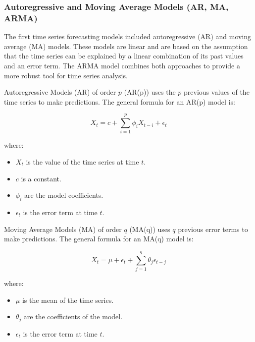 \subsubsection{Autoregressive and Moving Average Models (AR, MA, ARMA)}

The first time series forecasting models included autoregressive (AR) and moving average (MA) models. These models are linear and are based on the assumption that the time series can be explained by a linear combination of its past values and an error term. The ARMA model combines both approaches to provide a more robust tool for time series analysis.

Autoregressive Models (AR) of order \( p \) (AR(p)) uses the \( p \) previous values of the time series to make predictions. The general formula for an AR(p) model is:

\begin{equation}
X_t = c + \sum_{i=1}^{p} \phi_i X_{t-i} + \epsilon_t
\end{equation}

where:
\begin{itemize}
    \item \( X_t \) is the value of the time series at time \( t \).
    \item \( c \) is a constant.
    \item \( \phi_i \) are the model coefficients.
    \item \( \epsilon_t \) is the error term at time \( t \).
\end{itemize}

Moving Average Models (MA) of order \( q \) (MA(q)) uses \( q \) previous error terms to make predictions. The general formula for an MA(q) model is:

\begin{equation}
X_t = \mu + \epsilon_t + \sum_{j=1}^{q} \theta_j \epsilon_{t-j}
\end{equation}

where:
\begin{itemize}
    \item \( \mu \) is the mean of the time series.
    \item \( \theta_j \) are the coefficients of the model.
    \item \( \epsilon_t \) is the error term at time \( t \).
\end{itemize}

